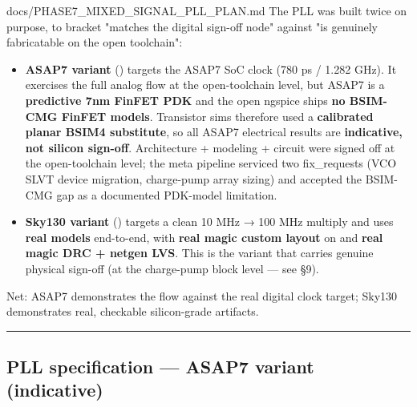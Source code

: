 \begin{relocated}{docs/PHASE7_MIXED_SIGNAL_PLL_PLAN.md}
The PLL was built twice on purpose, to bracket "matches the digital
sign-off node" against "is genuinely fabricatable on the open
toolchain":

\begin{itemize}
\tightlist
\item
  \textbf{ASAP7 variant} () targets the ASAP7
  SoC clock (780 ps / 1.282 GHz). It exercises the full analog flow at
  the open-toolchain level, but ASAP7 is a \textbf{predictive 7nm FinFET
  PDK} and the open ngspice ships \textbf{no BSIM-CMG FinFET models}.
  Transistor sims therefore used a \textbf{calibrated planar BSIM4
  substitute}, so all ASAP7 electrical results are \textbf{indicative,
  not silicon sign-off}. Architecture + modeling + circuit were signed
  off at the open-toolchain level; the meta pipeline serviced two
  fix\_\allowbreak{}requests (VCO SLVT device migration, charge-pump
  array sizing) and accepted the BSIM-CMG gap as a documented PDK-model
  limitation.
\item
  \textbf{Sky130 variant} () targets a
  clean 10 MHz → 100 MHz multiply and uses \textbf{real
   models} end-to-end, with \textbf{real magic custom
  layout} on  and \textbf{real magic DRC + netgen
  LVS}. This is the variant that carries genuine physical sign-off (at
  the charge-pump block level --- see §9).
\end{itemize}

Net: ASAP7 demonstrates the flow against the real digital clock target;
Sky130 demonstrates real, checkable silicon-grade artifacts.

\begin{center}\rule{0.5\linewidth}{0.5pt}\end{center}

\subsection{PLL specification --- ASAP7 variant (indicative)}\label{ds:ch:phase7-pll-plan:3-pll-specification-asap7-variant-indicative}

{\small\setlength{\tabcolsep}{4pt}

}
\end{relocated}
